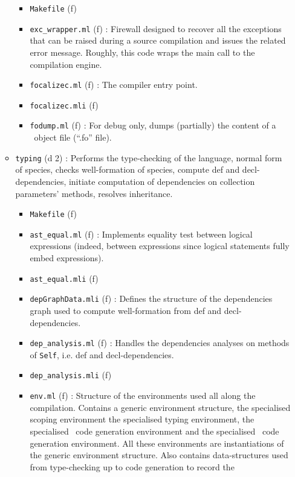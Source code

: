 \begin{itemize}
\begin{itemize}
\begin{itemize}
    \item {\tt Makefile} (f)
    \item {\tt exc\_wrapper.ml} (f) : Firewall designed to recover all
      the exceptions that can be raised during a source compilation
      and issues the related error message. Roughly, this code wraps
      the main call to the compilation engine.
    \item {\tt focalizec.ml} (f) : 
      The compiler entry point.
    \item {\tt focalizec.mli} (f)
    \item {\tt fodump.ml} (f) : For debug only, dumps (partially) the
      content of a \focalize\ object file (``.fo'' file).
    \end{itemize}
  \item {\tt typing} (d 2) : 
    Performs the type-checking of the
    language, normal form of species, checks well-formation of
    species, compute def and decl-dependencies, initiate computation
    of dependencies on collection parameters' methods, resolves
    inheritance.
    \begin{itemize}
    \item {\tt Makefile} (f)
    \item {\tt ast\_equal.ml} (f) : Implements equality test between
      logical expressions (indeed, between expressions since logical
      statements fully embed expressions).
    \item {\tt ast\_equal.mli} (f)
    \item {\tt depGraphData.mli} (f) : Defines the structure of the
      dependencies graph used to compute well-formation from def and
      decl-dependencies.
    \item {\tt dep\_analysis.ml} (f) : Handles the dependencies
      analyses on methods of {\tt Self}, i.e. def and decl-dependencies.
    \item {\tt dep\_analysis.mli} (f)
    \item {\tt env.ml} (f) : Structure of the environments used all
      along the compilation. Contains a generic environment
      structure, the specialised scoping environment the specialised
      typing environment, the specialised \ocaml\ code generation
      environment and the specialised \coq\ code generation
      environment. All these environments are instantiations of the
      generic environment structure. Also contains data-structures
      used from type-checking up to code generation to record the

\end{itemize}
\end{itemize}
\end{itemize}
